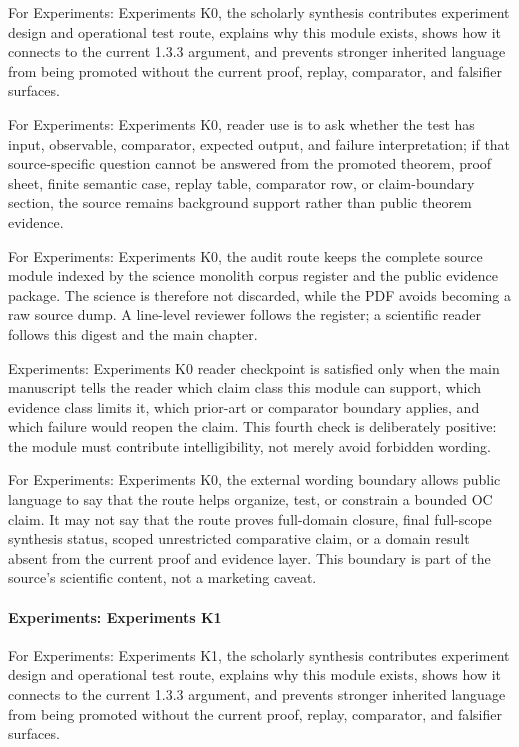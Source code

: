 For Experiments: Experiments K0, the scholarly synthesis contributes experiment design and operational test route, explains why this module exists, shows how it connects to the current 1.3.3 argument, and prevents stronger inherited language from being promoted without the current proof, replay, comparator, and falsifier surfaces.


For Experiments: Experiments K0, reader use is to ask whether the test has input, observable, comparator, expected output, and failure interpretation; if that source-specific question cannot be answered from the promoted theorem, proof sheet, finite semantic case, replay table, comparator row, or claim-boundary section, the source remains background support rather than public theorem evidence.


For Experiments: Experiments K0, the audit route keeps the complete source module indexed by the science monolith corpus register and the public evidence package. The science is therefore not discarded, while the PDF avoids becoming a raw source dump. A line-level reviewer follows the register; a scientific reader follows this digest and the main chapter.


Experiments: Experiments K0 reader checkpoint is satisfied only when the main manuscript tells the reader which claim class this module can support, which evidence class limits it, which prior-art or comparator boundary applies, and which failure would reopen the claim. This fourth check is deliberately positive: the module must contribute intelligibility, not merely avoid forbidden wording.


For Experiments: Experiments K0, the external wording boundary allows public language to say that the route helps organize, test, or constrain a bounded OC claim. It may not say that the route proves full-domain closure, final full-scope synthesis status, scoped unrestricted comparative claim, or a domain result absent from the current proof and evidence layer. This boundary is part of the source's scientific content, not a marketing caveat.


\paragraph{Experiments: Experiments K1}

For Experiments: Experiments K1, the scholarly synthesis contributes experiment design and operational test route, explains why this module exists, shows how it connects to the current 1.3.3 argument, and prevents stronger inherited language from being promoted without the current proof, replay, comparator, and falsifier surfaces.


